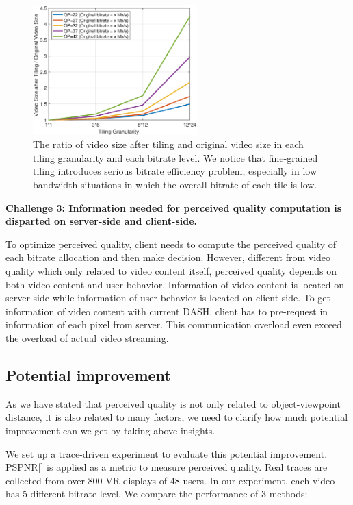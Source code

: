 \begin{figure}
  \centering
  \includegraphics[width=2.5in]{images/bitrateefficiency.eps}
  \caption{The ratio of video size after tiling and original video size in each tiling granularity and each bitrate level. We notice that fine-grained tiling introduces serious bitrate efficiency problem, especially in low bandwidth situations in which the overall bitrate of each tile is low.}
  \label{bitrateefficiency}
  \end{figure}

\textbf{Challenge 3: Information needed for perceived quality computation is disparted on server-side and client-side.} 

To optimize perceived quality, client needs to compute the perceived quality of each bitrate allocation and then make decision. However, different from video quality which only related to video content itself, perceived quality depends on both video content and user behavior. Information of video content is located on server-side while information of user behavior is located on client-side. To get information of video content with current DASH, client has to pre-request in information of each pixel from server. This communication overload even exceed the overload of actual video streaming.

\subsection{Potential improvement}

As we have stated that perceived quality is not only related to object-viewpoint distance, it is also related to many factors, we need to clarify how much potential improvement can we get by taking above insights.

We set up a trace-driven experiment to evaluate this potential improvement. PSPNR[] is applied as a metric to measure perceived quality. Real traces are collected from over 800 VR displays of 48 users. In our experiment, each video has 5 different bitrate level. We compare the performance of 3 methods:

